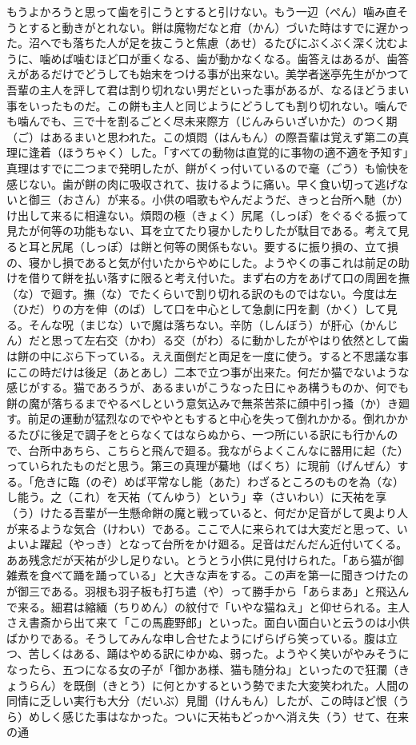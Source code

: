 \documentclass{book}
\begin{document}
もうよかろうと思って歯を引こうとすると引けない。もう一辺（ぺん）噛み直そうとすると動きがとれない。餅は魔物だなと疳（かん）づいた時はすでに遅かった。沼へでも落ちた人が足を抜こうと焦慮（あせ）るたびにぶくぶく深く沈むように、噛めば噛むほど口が重くなる、歯が動かなくなる。歯答えはあるが、歯答えがあるだけでどうしても始末をつける事が出来ない。美学者迷亭先生がかつて吾輩の主人を評して君は割り切れない男だといった事があるが、なるほどうまい事をいったものだ。この餅も主人と同じようにどうしても割り切れない。噛んでも噛んでも、三で十を割るごとく尽未来際方（じんみらいざいかた）のつく期（ご）はあるまいと思われた。この煩悶（はんもん）の際吾輩は覚えず第二の真理に逢着（ほうちゃく）した。「すべての動物は直覚的に事物の適不適を予知す」真理はすでに二つまで発明したが、餅がくっ付いているので毫（ごう）も愉快を感じない。歯が餅の肉に吸収されて、抜けるように痛い。早く食い切って逃げないと御三（おさん）が来る。小供の唱歌もやんだようだ、きっと台所へ馳（か）け出して来るに相違ない。煩悶の極（きょく）尻尾（しっぽ）をぐるぐる振って見たが何等の功能もない、耳を立てたり寝かしたりしたが駄目である。考えて見ると耳と尻尾（しっぽ）は餅と何等の関係もない。要するに振り損の、立て損の、寝かし損であると気が付いたからやめにした。ようやくの事これは前足の助けを借りて餅を払い落すに限ると考え付いた。まず右の方をあげて口の周囲を撫（な）で廻す。撫（な）でたくらいで割り切れる訳のものではない。今度は左（ひだ）りの方を伸（のば）して口を中心として急劇に円を劃（かく）して見る。そんな呪（まじな）いで魔は落ちない。辛防（しんぼう）が肝心（かんじん）だと思って左右交（かわ）る交（がわ）るに動かしたがやはり依然として歯は餅の中にぶら下っている。ええ面倒だと両足を一度に使う。すると不思議な事にこの時だけは後足（あとあし）二本で立つ事が出来た。何だか猫でないような感じがする。猫であろうが、あるまいがこうなった日にゃあ構うものか、何でも餅の魔が落ちるまでやるべしという意気込みで無茶苦茶に顔中引っ掻（か）き廻す。前足の運動が猛烈なのでややともすると中心を失って倒れかかる。倒れかかるたびに後足で調子をとらなくてはならぬから、一つ所にいる訳にも行かんので、台所中あちら、こちらと飛んで廻る。我ながらよくこんなに器用に起（た）っていられたものだと思う。第三の真理が驀地（ばくち）に現前（げんぜん）する。「危きに臨（のぞ）めば平常なし能（あた）わざるところのものを為（な）し能う。之（これ）を天祐（てんゆう）という」幸（さいわい）に天祐を享（う）けたる吾輩が一生懸命餅の魔と戦っていると、何だか足音がして奥より人が来るような気合（けわい）である。ここで人に来られては大変だと思って、いよいよ躍起（やっき）となって台所をかけ廻る。足音はだんだん近付いてくる。ああ残念だが天祐が少し足りない。とうとう小供に見付けられた。「あら猫が御雑煮を食べて踊を踊っている」と大きな声をする。この声を第一に聞きつけたのが御三である。羽根も羽子板も打ち遣（や）って勝手から「あらまあ」と飛込んで来る。細君は縮緬（ちりめん）の紋付で「いやな猫ねえ」と仰せられる。主人さえ書斎から出て来て「この馬鹿野郎」といった。面白い面白いと云うのは小供ばかりである。そうしてみんな申し合せたようにげらげら笑っている。腹は立つ、苦しくはある、踊はやめる訳にゆかぬ、弱った。ようやく笑いがやみそうになったら、五つになる女の子が「御かあ様、猫も随分ね」といったので狂瀾（きょうらん）を既倒（きとう）に何とかするという勢でまた大変笑われた。人間の同情に乏しい実行も大分（だいぶ）見聞（けんもん）したが、この時ほど恨（うら）めしく感じた事はなかった。ついに天祐もどっかへ消え失（う）せて、在来の通
\end{document}
